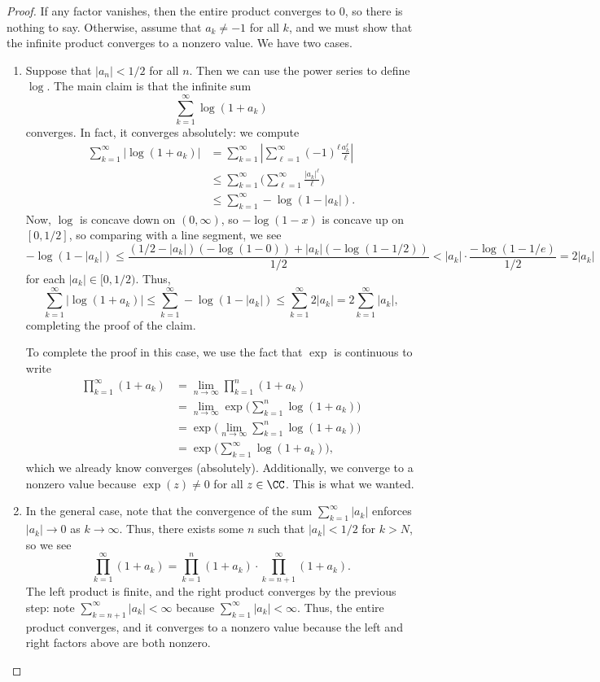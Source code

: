 \documentclass[notes.tex]{subfiles}
\begin{document}
\begin{proof}
	If any factor vanishes, then the entire product converges to $0$, so there is nothing to say. Otherwise, assume that $a_k\ne-1$ for all $k$, and we must show that the infinite product converges to a nonzero value. We have two cases.
	\begin{enumerate}
		\item Suppose that $|a_n|<1/2$ for all $n$. Then we can use the power series to define $\log$. The main claim is that the infinite sum
		\[\sum_{k=1}^\infty\log(1+a_k)\]
		converges. In fact, it converges absolutely: we compute
		\begin{align*}
			\sum_{k=1}^\infty|\log(1+a_k)| &= \sum_{k=1}^\infty\left|\sum_{\ell=1}^\infty(-1)^\ell\frac{a_k^\ell}\ell\right| \\
			&\le \sum_{k=1}^\infty\Bigg(\sum_{\ell=1}^\infty\frac{|a_k|^\ell}\ell\Bigg) \\
			&\le \sum_{k=1}^\infty-\log(1-|a_k|).
		\end{align*}
		Now, $\log$ is concave down on $(0,\infty)$, so $-\log(1-x)$ is concave up on $[0,1/2]$, so comparing with a line segment, we see
		\[-\log(1-|a_k|)\le\frac{(1/2-|a_k|)(-\log(1-0))+|a_k|(-\log(1-1/2))}{1/2}<|a_k|\cdot\frac{-\log(1-1/e)}{1/2}=2|a_k|\]
		for each $|a_k|\in[0,1/2)$. Thus,
		\[\sum_{k=1}^\infty|\log(1+a_k)|\le\sum_{k=1}^\infty-\log(1-|a_k|)\le\sum_{k=1}^\infty2|a_k|=2\sum_{k=1}^\infty|a_k|,\]
		completing the proof of the claim.

		To complete the proof in this case, we use the fact that $\exp$ is continuous to write
		\begin{align*}
			\prod_{k=1}^\infty(1+a_k) &= \lim_{n\to\infty}\prod_{k=1}^n(1+a_k) \\
			&= \lim_{n\to\infty}\exp\Bigg(\sum_{k=1}^n\log(1+a_k)\Bigg) \\
			&= \exp\Bigg(\lim_{n\to\infty}\sum_{k=1}^n\log(1+a_k)\Bigg) \\
			&= \exp\Bigg(\sum_{k=1}^\infty\log(1+a_k)\Bigg),
		\end{align*}
		which we already know converges (absolutely). Additionally, we converge to a nonzero value because $\exp(z)\ne0$ for all $z\in\CC$. This is what we wanted.

		\item In the general case, note that the convergence of the sum $\sum_{k=1}^\infty|a_k|$ enforces $|a_k|\to0$ as $k\to\infty$. Thus, there exists some $n$ such that $|a_k|<1/2$ for $k>N$, so we see
		\[\prod_{k=1}^\infty(1+a_k)=\prod_{k=1}^n(1+a_k)\cdot\prod_{k=n+1}^\infty(1+a_k).\]
		The left product is finite, and the right product converges by the previous step: note $\sum_{k=n+1}^\infty|a_k|<\infty$ because $\sum_{k=1}^\infty|a_k|<\infty$. Thus, the entire product converges, and it converges to a nonzero value because the left and right factors above are both nonzero.
		\qedhere
	\end{enumerate}
\end{proof}
\end{document}
